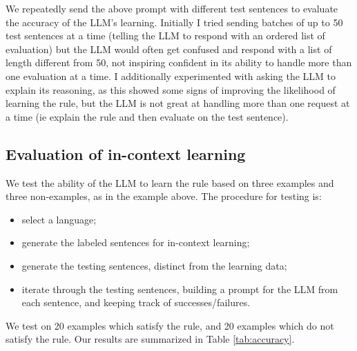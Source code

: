\documentclass[titlepage, hidelinks, 12pt]{article}
\theoremstyle{plain}
\theoremstyle{remark}
\theoremstyle{definition}
\begin{document}
We repeatedly send the above prompt with different test sentences to evaluate the accuracy of the LLM's learning. Initially
I tried sending batches of up to 50 test sentences at a time (telling the LLM to respond with an ordered list
of evaluation) but the LLM would often get confused and respond with a list of length different from 50, not inspiring confident in
its ability to handle more than one evaluation at a time. I additionally experimented with asking the LLM to explain its reasoning,
as this showed some signs of improving the likelihood of learning the rule, but the LLM is not great at handling more than one request
at a time (ie explain the rule and then evaluate on the test sentence). 

\subsection{Evaluation of in-context learning}

We test the ability of the LLM to learn the rule based on three examples and three non-examples, as in the example above. The procedure for
testing is:
\begin{itemize}
    \item select a language;
    \item generate the labeled sentences for in-context learning;
    \item generate the testing sentences, distinct from the learning data;
    \item iterate through the testing sentences, building a prompt for the LLM from each sentence, and keeping track of successes/failures.
\end{itemize}
We test on 20 examples which satisfy the rule, and 20 examples which do not satisfy the rule. Our results are summarized in Table \ref{tab:accuracy}. 
\end{document}
